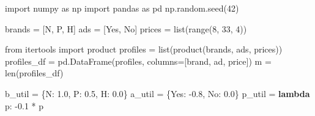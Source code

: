 \documentclass[
  letterpaper,
  DIV=11,
  numbers=noendperiod]{scrartcl}
\newenvironment{Shaded}{\begin{snugshade}}{\end{snugshade}}
\newcommand{\BuiltInTok}[1]{\textcolor[rgb]{0.00,0.23,0.31}{#1}}
\newcommand{\DecValTok}[1]{\textcolor[rgb]{0.68,0.00,0.00}{#1}}
\newcommand{\FloatTok}[1]{\textcolor[rgb]{0.68,0.00,0.00}{#1}}
\newcommand{\ImportTok}[1]{\textcolor[rgb]{0.00,0.46,0.62}{#1}}
\newcommand{\KeywordTok}[1]{\textcolor[rgb]{0.00,0.23,0.31}{\textbf{#1}}}
\newcommand{\NormalTok}[1]{\textcolor[rgb]{0.00,0.23,0.31}{#1}}
\newcommand{\OperatorTok}[1]{\textcolor[rgb]{0.37,0.37,0.37}{#1}}
\newcommand{\StringTok}[1]{\textcolor[rgb]{0.13,0.47,0.30}{#1}}
\begin{document}
\begin{tcolorbox}[enhanced jigsaw, arc=.35mm, left=2mm, coltitle=black, breakable, bottomrule=.15mm, colback=white, bottomtitle=1mm, rightrule=.15mm, title=\textcolor{quarto-callout-note-color}{\faInfo}\hspace{0.5em}{Note}, colbacktitle=quarto-callout-note-color!10!white, toprule=.15mm, titlerule=0mm, toptitle=1mm, leftrule=.75mm, opacitybacktitle=0.6, colframe=quarto-callout-note-color-frame, opacityback=0]

\begin{Shaded}
\begin{Highlighting}[]
\ImportTok{import}\NormalTok{ numpy }\ImportTok{as}\NormalTok{ np}
\ImportTok{import}\NormalTok{ pandas }\ImportTok{as}\NormalTok{ pd}
\NormalTok{np.random.seed(}\DecValTok{42}\NormalTok{)}

\NormalTok{brands }\OperatorTok{=}\NormalTok{ [}\StringTok{\textquotesingle{}N\textquotesingle{}}\NormalTok{, }\StringTok{\textquotesingle{}P\textquotesingle{}}\NormalTok{, }\StringTok{\textquotesingle{}H\textquotesingle{}}\NormalTok{]  }
\NormalTok{ads }\OperatorTok{=}\NormalTok{ [}\StringTok{\textquotesingle{}Yes\textquotesingle{}}\NormalTok{, }\StringTok{\textquotesingle{}No\textquotesingle{}}\NormalTok{]      }
\NormalTok{prices }\OperatorTok{=} \BuiltInTok{list}\NormalTok{(}\BuiltInTok{range}\NormalTok{(}\DecValTok{8}\NormalTok{, }\DecValTok{33}\NormalTok{, }\DecValTok{4}\NormalTok{))  }


\ImportTok{from}\NormalTok{ itertools }\ImportTok{import}\NormalTok{ product}
\NormalTok{profiles }\OperatorTok{=} \BuiltInTok{list}\NormalTok{(product(brands, ads, prices))}
\NormalTok{profiles\_df }\OperatorTok{=}\NormalTok{ pd.DataFrame(profiles, columns}\OperatorTok{=}\NormalTok{[}\StringTok{\textquotesingle{}brand\textquotesingle{}}\NormalTok{, }\StringTok{\textquotesingle{}ad\textquotesingle{}}\NormalTok{, }\StringTok{\textquotesingle{}price\textquotesingle{}}\NormalTok{])}
\NormalTok{m }\OperatorTok{=} \BuiltInTok{len}\NormalTok{(profiles\_df)}


\NormalTok{b\_util }\OperatorTok{=}\NormalTok{ \{}\StringTok{\textquotesingle{}N\textquotesingle{}}\NormalTok{: }\FloatTok{1.0}\NormalTok{, }\StringTok{\textquotesingle{}P\textquotesingle{}}\NormalTok{: }\FloatTok{0.5}\NormalTok{, }\StringTok{\textquotesingle{}H\textquotesingle{}}\NormalTok{: }\FloatTok{0.0}\NormalTok{\}             }
\NormalTok{a\_util }\OperatorTok{=}\NormalTok{ \{}\StringTok{\textquotesingle{}Yes\textquotesingle{}}\NormalTok{: }\OperatorTok{{-}}\FloatTok{0.8}\NormalTok{, }\StringTok{\textquotesingle{}No\textquotesingle{}}\NormalTok{: }\FloatTok{0.0}\NormalTok{\}                   }
\NormalTok{p\_util }\OperatorTok{=} \KeywordTok{lambda}\NormalTok{ p: }\OperatorTok{{-}}\FloatTok{0.1} \OperatorTok{*}\NormalTok{ p                         }



\end{Highlighting}
\end{Shaded}
\end{tcolorbox}
\end{document}
